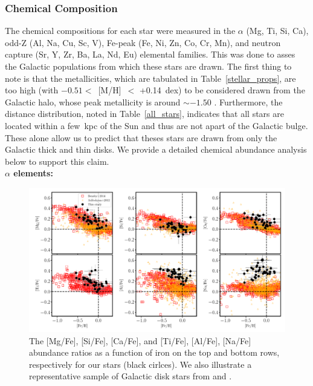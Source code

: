 \documentclass[a4paper,fleqn,usenatbib]{mnras}
\begin{document}
\subsubsection{Chemical Composition}
\label{chemical}
The chemical compositions for each star were measured in the $\alpha$ (Mg, Ti, Si, Ca), odd-Z (Al, Na, Cu, Sc, V), Fe-peak (Fe, Ni, Zn, Co, Cr, Mn), and neutron capture (Sr, Y, Zr, Ba, La, Nd, Eu) elemental families. This was done to asses the Galactic populations from which these stars are drawn. The first thing to note is that the metallicities, which are tabulated in Table~\ref{stellar_props}, are too high (with $-0.51<$~[M/H]~$<$ +0.14~dex) to be considered drawn from the Galactic halo, whose peak metallicity is around $\sim -1.50$ \cite[e.g.][]{Chiba2000}. Furthermore, the distance distribution, noted in Table~\ref{all_stars}, indicates that all stars are located within a few~kpc of the Sun and thus are not apart of the Galactic bulge. These alone allow us to predict that theses stars are drawn from only the Galactic thick and thin disks. We provide a detailed chemical abundance analysis below to support this claim.\\
{\bf $\alpha$ elements:}\\
\begin{figure}
\noindent\includegraphics[width=\textwidth,keepaspectratio]{Pope_spectra_alphaele.pdf}

\caption{\label{alphael}
The [Mg/Fe], [Si/Fe], [Ca/Fe], and [Ti/Fe], [Al/Fe], [Na/Fe] abundance ratios as a function of iron on the top and bottom rows, respectively for our stars (black cirlces). We also illustrate a representative sample of Galactic disk stars from \citet[open red square,][]{Bensby2014} and \citet[open orange triangles,][]{Adibekyan2012}. } 
\end{figure}
\end{document}
